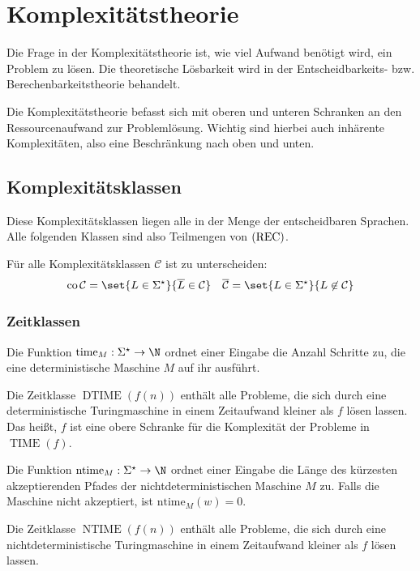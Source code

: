 \chapter{Komplexitätstheorie}
Die Frage in der Komplexitätstheorie ist, wie viel Aufwand benötigt wird, ein Problem zu lösen.
Die theoretische Lösbarkeit wird in der Entscheidbarkeits- bzw. Berechenbarkeitstheorie behandelt.

Die Komplexitätstheorie befasst sich mit oberen und unteren Schranken an den Ressourcenaufwand zur Problemlösung.
Wichtig sind hierbei auch inhärente Komplexitäten, also eine Beschränkung nach oben und unten.
\section{Komplexitätsklassen}
Diese Komplexitätsklassen liegen alle in der Menge der entscheidbaren Sprachen. Alle folgenden Klassen sind also Teilmengen von $\mathrm{(REC)}$.

Für alle Komplexitätsklassen $\mathcal C$ ist zu unterscheiden:
\begin{align*}
	\operatorname{co}\mathcal C=\set{L\in\Sigma^\star}{\overline L \in\mathcal C} && \overline{\mathcal C}=\set{L\in\Sigma^\star}{L\not\in \mathcal C}
\end{align*}
\subsection{Zeitklassen}
\begin{multicols}{2}
	Die Funktion $\mathrm{time}_M:\Sigma^\star\rightarrow \N$ ordnet einer Eingabe die Anzahl Schritte zu, die eine deterministische Maschine $M$ auf ihr ausführt.

	Die Zeitklasse $\operatorname{DTIME}(f(n))$ enthält alle Probleme, die sich durch eine deterministische Turingmaschine in einem Zeitaufwand kleiner als $f$ lösen lassen. Das heißt, $f$ ist eine obere Schranke für die Komplexität der Probleme in $\operatorname{TIME}(f)$.

	\columnbreak

	Die Funktion $\mathrm{ntime}_M:\Sigma^\star\rightarrow \N$ ordnet einer Eingabe die Länge des kürzesten akzeptierenden Pfades der nichtdeterministischen Maschine $M$ zu. Falls die Maschine nicht akzeptiert, ist $\mathrm{ntime}_M(w)=0$.

	Die Zeitklasse $\operatorname{NTIME}(f(n))$ enthält alle Probleme, die sich durch eine nichtdeterministische Turingmaschine in einem Zeitaufwand kleiner als $f$ lösen lassen.
\end{multicols}



